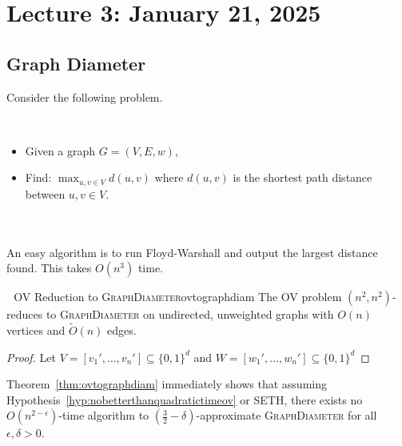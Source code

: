 \pagebreak
    
\section{Lecture 3: January 21, 2025}

    \subsection{Graph Diameter}

        Consider the following problem.
        \begin{compprob} \label{prob:graphdiam}
            \vphantom
            \\
            \begin{itemize}
                \item Given a graph \(G=(V,E,w)\), 
                \item Find: \(\max_{u,v\in V}d(u,v)\) where \(d(u,v)\) is the shortest path distance between \(u,v\in V\).
            \end{itemize}
            
        \end{compprob}
        \vphantom
        \\
        \\
        An easy algorithm is to run Floyd-Warshall and output the largest distance found. This takes \(O(n^3)\) time.
        \begin{theorem}{\Stop\,\,\cite{roditty2013fast} \textsc{OV} Reduction to \textsc{GraphDiameter}}{ovtographdiam}
            The \textsc{OV} problem \((n^2,n^2)\)-reduces to \textsc{GraphDiameter} on undirected, unweighted graphs with \(O(n)\) vertices and \(\tilde{O}(n)\) edges.
            \begin{proof}
                Let \(V=[v_1',\ldots,v_n']\subseteq\{0,1\}^d\) and \(W=[w_1',\ldots,w_n']\subseteq\{0,1\}^d\)
            \end{proof}
        \end{theorem}
        \begin{remark*}
            Theorem~\ref{thm:ovtographdiam} immediately shows that assuming Hypothesis~\ref{hyp:nobetterthanquadratictimeov} or SETH, there exists no \(O\left(n^{2-\epsilon}\right)\)-time algorithm to \(\left(\frac{3}{2}-\delta\right)\)-approximate \textsc{GraphDiameter} for all \(\epsilon,\delta>0\).
        \end{remark*}




